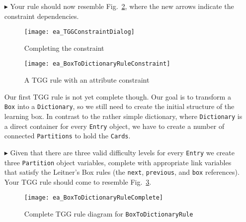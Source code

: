 \begin{enumerate}
\item[$\blacktriangleright$] Your rule should now resemble Fig.~\ref{ea:tgg_rule_with_constraint}, where the new arrows indicate the constraint dependencies.

\newpage

\begin{figure}[htbp]
\begin{center}
  \texttt{[image: ea\_TGGConstraintDialog]}
  \caption{Completing the constraint}
  \label{ea:first_tgg_constraint}
\end{center}
\end{figure}

\vspace{1cm}

\begin{figure}[h!]
\begin{center}
  \texttt{[image: ea\_BoxToDictionaryRuleConstraint]}
  \caption{A TGG rule with an attribute constraint}
  \label{ea:tgg_rule_with_constraint}
  \end{center}
\end{figure}

\newpage

Our first TGG rule is not yet complete though. Our goal is to transform a \texttt{Box} into a \texttt{Dictionary}, so we still need to create the initial
structure of the learning box. In contrast to the rather simple dictionary, where \texttt{Dictionary} is a direct container for every \texttt{Entry} object, we
have to create a number of connected \texttt{Partitions} to hold the \texttt{Cards}.

\vspace{0.5cm}

\item[$\blacktriangleright$] Given that there are three valid difficulty levels for every \texttt{Entry} we create three \texttt{Partition} object variables,
complete with appropriate link variables that satisfy the Leitner's Box rules (the \texttt{next}, \texttt{previous}, and \texttt{box} references). Your TGG rule
should come to resemble Fig.~\ref{ea:boxtodictionaryrule_complete}.

\vspace{0.5cm}

\begin{figure}[htbp]
\hspace{-2cm}
  \texttt{[image: ea\_BoxToDictionaryRuleComplete]}
  \caption{Complete TGG rule diagram for \texttt{BoxToDictionaryRule}}
  \label{ea:boxtodictionaryrule_complete}
\end{figure}

\end{enumerate}

